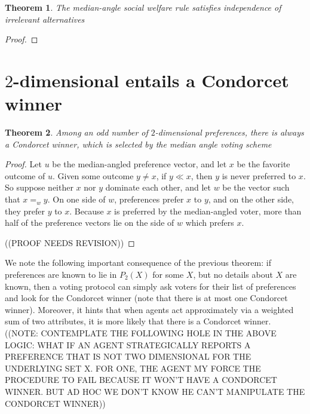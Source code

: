 \documentclass[12pt]{article}
\newtheorem{theorem}{Theorem}
\newcommand{\1}[1]{\mathds{1}[{#1}]}
\begin{document}
  \begin{theorem}
    The median-angle social welfare rule satisfies independence of irrelevant
    alternatives
  \end{theorem}
  \begin{proof}
  \end{proof}

\section{$2$-dimensional entails a Condorcet winner}

  \begin{theorem}
    Among an odd number of $2$-dimensional preferences,
    there is always a Condorcet winner, which is selected
    by the median angle voting scheme
  \end{theorem}
  \begin{proof}
    Let $u$ be the median-angled preference vector, and let
    $x$ be the favorite outcome of $u$.
    Given some outcome $y\ne x$, if $y \ll x$, then
    $y$ is never preferred to $x$.
    So suppose neither $x$ nor $y$ dominate each other, and let
    $w$ be the vector such that $x =_w y$.
    On one side of $w$, preferences prefer $x$ to $y$,
    and on the other side, they prefer $y$ to $x$.
    Because $x$ is preferred by the median-angled voter,
    more than half of the preference vectors lie on the side of $w$
    which prefers $x$.

    ((PROOF NEEDS REVISION))
  \end{proof}

  We note the following important consequence of the previous theorem:
  if preferences are known to lie in $P_2(X)$ for some $X$,
  but no details about $X$ are known, then a voting protocol can simply
  ask voters for their list of preferences and look for the Condorcet
  winner (note that there is at most one Condorcet winner).
  Moreover, it hints that when agents act approximately via a weighted
  sum of two attributes, it is more likely that there is a Condorcet winner.
  ((NOTE: CONTEMPLATE THE FOLLOWING HOLE IN THE ABOVE LOGIC:
  WHAT IF AN AGENT STRATEGICALLY REPORTS A PREFERENCE THAT IS NOT TWO
  DIMENSIONAL FOR THE UNDERLYING SET X. FOR ONE, THE AGENT MY FORCE THE
  PROCEDURE TO FAIL BECAUSE IT WON'T HAVE A CONDORCET WINNER. BUT AD HOC 
  WE DON'T KNOW HE CAN'T MANIPULATE THE CONDORCET WINNER))
\end{document}
